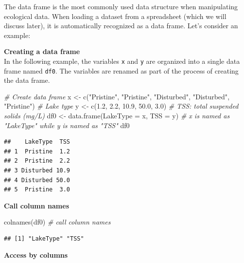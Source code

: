 \documentclass[
]{article}
\newenvironment{Shaded}{\begin{snugshade}}{\end{snugshade}}
\newcommand{\AttributeTok}[1]{\textcolor[rgb]{0.77,0.63,0.00}{#1}}
\newcommand{\CommentTok}[1]{\textcolor[rgb]{0.56,0.35,0.01}{\textit{#1}}}
\newcommand{\FloatTok}[1]{\textcolor[rgb]{0.00,0.00,0.81}{#1}}
\newcommand{\FunctionTok}[1]{\textcolor[rgb]{0.00,0.00,0.00}{#1}}
\newcommand{\NormalTok}[1]{#1}
\newcommand{\OtherTok}[1]{\textcolor[rgb]{0.56,0.35,0.01}{#1}}
\newcommand{\StringTok}[1]{\textcolor[rgb]{0.31,0.60,0.02}{#1}}
\begin{document}
The data frame is the most commonly used data structure when manipulating ecological data. When loading a dataset from a spreadsheet (which we will discuss later), it is automatically recognized as a data frame. Let's consider an example:

\textbf{Creating a data frame}\\
In the following example, the variables \texttt{x} and \texttt{y} are organized into a single data frame named \texttt{df0}. The variables are renamed as part of the process of creating the data frame.

\begin{Shaded}
\begin{Highlighting}[]
\CommentTok{\# Create data frame}
\NormalTok{x }\OtherTok{\textless{}{-}} \FunctionTok{c}\NormalTok{(}\StringTok{"Pristine"}\NormalTok{, }\StringTok{"Pristine"}\NormalTok{, }\StringTok{"Disturbed"}\NormalTok{, }\StringTok{"Disturbed"}\NormalTok{, }\StringTok{"Pristine"}\NormalTok{) }\CommentTok{\# Lake type}
\NormalTok{y }\OtherTok{\textless{}{-}} \FunctionTok{c}\NormalTok{(}\FloatTok{1.2}\NormalTok{, }\FloatTok{2.2}\NormalTok{, }\FloatTok{10.9}\NormalTok{, }\FloatTok{50.0}\NormalTok{, }\FloatTok{3.0}\NormalTok{) }\CommentTok{\# TSS: total suspended solids (mg/L)}
\NormalTok{df0 }\OtherTok{\textless{}{-}} \FunctionTok{data.frame}\NormalTok{(}\AttributeTok{LakeType =}\NormalTok{ x, }\AttributeTok{TSS =}\NormalTok{ y) }\CommentTok{\# x is named as "LakeType" while y is named as "TSS"}
\NormalTok{df0}
\end{Highlighting}
\end{Shaded}

\begin{verbatim}
##    LakeType  TSS
## 1  Pristine  1.2
## 2  Pristine  2.2
## 3 Disturbed 10.9
## 4 Disturbed 50.0
## 5  Pristine  3.0
\end{verbatim}

\textbf{Call column names}

\begin{Shaded}
\begin{Highlighting}[]
\FunctionTok{colnames}\NormalTok{(df0) }\CommentTok{\# call column names}
\end{Highlighting}
\end{Shaded}

\begin{verbatim}
## [1] "LakeType" "TSS"
\end{verbatim}

\textbf{Access by columns}
\end{document}
